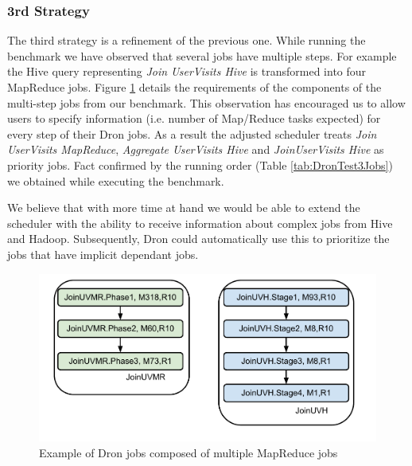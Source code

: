 \documentclass[11pt,a4paper,twoside]{report}
\begin{document}
\subsubsection{3rd Strategy}
The third strategy is a refinement of the previous one. While running the benchmark we have observed that several jobs have multiple steps. For example the Hive query representing \textit{Join UserVisits Hive} is transformed into four MapReduce jobs. Figure \ref{fig:MultiJoin} details the requirements of the components of the multi-step jobs from our benchmark. This observation has encouraged us to allow users to specify information (i.e. number of Map/Reduce tasks expected) for every step of their Dron jobs. As a result the adjusted scheduler treats \textit{Join UserVisits MapReduce}, \textit{Aggregate UserVisits Hive} and  \textit{JoinUserVisits Hive} as priority jobs. Fact confirmed by the running order (Table \ref{tab:DronTest3Jobs}) we obtained while executing the benchmark.


We believe that with more time at hand we would be able to extend the scheduler with the ability to receive information about complex jobs from Hive and Hadoop. Subsequently, Dron could automatically use this to prioritize the jobs that have implicit dependant jobs.


\begin{figure}[h]
\centering
\includegraphics[scale=0.50]{MultiJoin}
\caption{Example of Dron jobs composed of multiple MapReduce jobs}
\label{fig:MultiJoin}
\end{figure}
\end{document}
